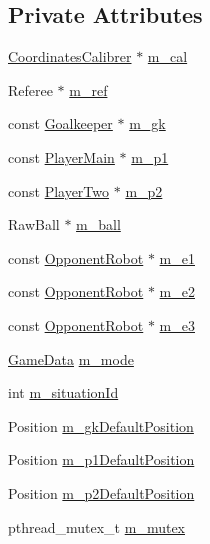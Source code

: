\subsection*{Private Attributes}
\begin{DoxyCompactItemize}
\item 
\hyperlink{classCoordinatesCalibrer}{CoordinatesCalibrer} $\ast$ \hyperlink{classInterpreter_a734c73b13d471eb10d9a0ce772ffd906}{m\_\-cal}
\item 
Referee $\ast$ \hyperlink{classInterpreter_a883b74196b1cf25fc6461642c62bc4ec}{m\_\-ref}
\item 
const \hyperlink{classGoalkeeper}{Goalkeeper} $\ast$ \hyperlink{classInterpreter_a5c100f5098dbea4f12c8e65524914891}{m\_\-gk}
\item 
const \hyperlink{classPlayerMain}{PlayerMain} $\ast$ \hyperlink{classInterpreter_af450bd472149d0832c48e5da0a21ac77}{m\_\-p1}
\item 
const \hyperlink{classPlayerTwo}{PlayerTwo} $\ast$ \hyperlink{classInterpreter_aefbda2bf4d390731938a93ff3e2bfaa6}{m\_\-p2}
\item 
RawBall $\ast$ \hyperlink{classInterpreter_abed4bfde044196ee1ed466bcc62efbd2}{m\_\-ball}
\item 
const \hyperlink{classOpponentRobot}{OpponentRobot} $\ast$ \hyperlink{classInterpreter_a373544ccef8dc7630108349b589cee3d}{m\_\-e1}
\item 
const \hyperlink{classOpponentRobot}{OpponentRobot} $\ast$ \hyperlink{classInterpreter_aa04c8b2059980f776ea43c6f5e8e734b}{m\_\-e2}
\item 
const \hyperlink{classOpponentRobot}{OpponentRobot} $\ast$ \hyperlink{classInterpreter_ab61a3f3a1896b2d0d886aadcd15d72c1}{m\_\-e3}
\item 
\hyperlink{structInterpreter_1_1GameData}{GameData} \hyperlink{classInterpreter_aea59ccd407d1cbe579827da6ef24c9a1}{m\_\-mode}
\item 
int \hyperlink{classInterpreter_abe055996cec8f18725f3efb89e7e6ecb}{m\_\-situationId}
\item 
Position \hyperlink{classInterpreter_a3406559374dd0b28b8d702e5ba03189b}{m\_\-gkDefaultPosition}
\item 
Position \hyperlink{classInterpreter_a681f0273945917ab4dabec7b400bf001}{m\_\-p1DefaultPosition}
\item 
Position \hyperlink{classInterpreter_a2eb14ab69e51a5bdd6e393ed86b2d687}{m\_\-p2DefaultPosition}
\item 
pthread\_\-mutex\_\-t \hyperlink{classInterpreter_a4b1e804ce863d4d017e4b697e61e4017}{m\_\-mutex}

\end{DoxyCompactItemize}
